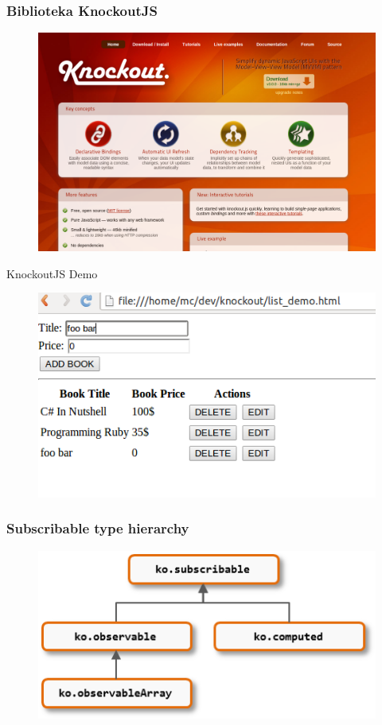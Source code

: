 \documentclass{beamer}
\begin{document}
\begin{frame}
	\frametitle{Biblioteka KnockoutJS}
	\begin{figure}
		\centering
		\includegraphics[width=\textwidth]{img/ko_page}
	\end{figure}
\end{frame}

\begin{frame}
	\Huge{\centerline{KnockoutJS Demo}}
	\begin{figure}
		\centering
		\includegraphics[width=\textwidth]{img/demo}
	\end{figure}
\end{frame}

\begin{frame}
	\frametitle{Subscribable type hierarchy}
	\begin{figure}
		\centering
		\includegraphics[width=\textwidth]{img/type-hierarchy}
	\end{figure}
\end{frame}
\end{document}
